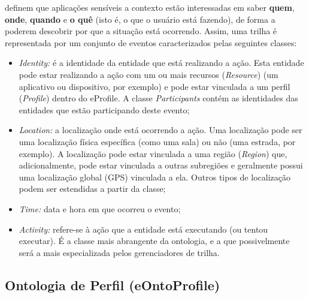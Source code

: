  definem que aplicações sensíveis a contexto estão interessadas em saber {\bf quem}, {\bf onde}, {\bf quando} e {\bf o quê} (isto é, o que o usuário está fazendo), de forma a poderem descobrir por que a situação está ocorrendo. Assim, uma trilha é representada por um conjunto de eventos caracterizados pelas seguintes classes:

\begin{itemize}

  \item {\em Identity:} é a identidade da entidade que está realizando a ação. Esta entidade pode estar realizando a ação com um ou mais recursos ({\em Resource}) (um aplicativo ou dispositivo, por exemplo) e pode estar vinculada a um perfil ({\em Profile}) dentro do eProfile. A classe {\em Participants} contém as identidades das entidades que estão participando deste evento;

  \item {\em Location:} a localização onde está ocorrendo a ação. Uma localização pode ser uma localização física específica (como uma sala) ou não (uma estrada, por exemplo). A localização pode estar vinculada a uma região ({\em Region}) que, adicionalmente, pode estar vinculada a outras subregiões e geralmente possui uma localização global (GPS) vinculada a ela. Outros tipos de localização podem ser estendidas a partir da classe;

  \item {\em Time:} data e hora em que ocorreu o evento;

  \item {\em Activity:} refere-se à ação que a entidade está executando (ou tentou executar). É a classe mais abrangente da ontologia, e a que possivelmente será a mais especializada pelos gerenciadores de trilha.

\end{itemize}



\subsection{Ontologia de Perfil (eOntoProfile)}
\label{sec:eontoprofile}

